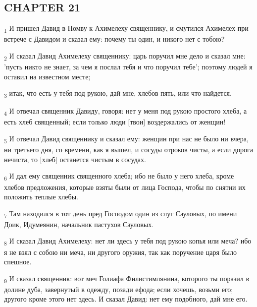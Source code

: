 \subsection{CHAPTER 21}
\begin{tcolorbox}
\textsubscript{1} И пришел Давид в Номву к Ахимелеху священнику, и смутился Ахимелех при встрече с Давидом и сказал ему: почему ты один, и никого нет с тобою?
\end{tcolorbox}
\begin{tcolorbox}
\textsubscript{2} И сказал Давид Ахимелеху священнику: царь поручил мне дело и сказал мне: 'пусть никто не знает, за чем я послал тебя и что поручил тебе'; поэтому людей я оставил на известном месте;
\end{tcolorbox}
\begin{tcolorbox}
\textsubscript{3} итак, что есть у тебя под рукою, дай мне, хлебов пять, или что найдется.
\end{tcolorbox}
\begin{tcolorbox}
\textsubscript{4} И отвечал священник Давиду, говоря: нет у меня под рукою простого хлеба, а есть хлеб священный; если только люди [твои] воздержались от женщин!
\end{tcolorbox}
\begin{tcolorbox}
\textsubscript{5} И отвечал Давид священнику и сказал ему: женщин при нас не было ни вчера, ни третьего дня, со времени, как я вышел, и сосуды отроков чисты, а если дорога нечиста, то [хлеб] останется чистым в сосудах.
\end{tcolorbox}
\begin{tcolorbox}
\textsubscript{6} И дал ему священник священного хлеба; ибо не было у него хлеба, кроме хлебов предложения, которые взяты были от лица Господа, чтобы по снятии их положить теплые хлебы.
\end{tcolorbox}
\begin{tcolorbox}
\textsubscript{7} Там находился в тот день пред Господом один из слуг Сауловых, по имени Доик, Идумеянин, начальник пастухов Сауловых.
\end{tcolorbox}
\begin{tcolorbox}
\textsubscript{8} И сказал Давид Ахимелеху: нет ли здесь у тебя под рукою копья или меча? ибо я не взял с собою ни меча, ни другого оружия, так как поручение царя было спешное.
\end{tcolorbox}
\begin{tcolorbox}
\textsubscript{9} И сказал священник: вот меч Голиафа Филистимлянина, которого ты поразил в долине дуба, завернутый в одежду, позади ефода; если хочешь, возьми его; другого кроме этого нет здесь. И сказал Давид: нет ему подобного, дай мне его.
\end{tcolorbox}
